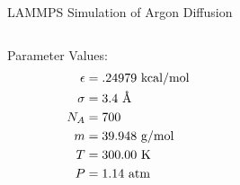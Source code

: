 \documentclass[professionalfont]{beamer}
\theoremstyle{remark}
\begin{document}
\begin{frame}{LAMMPS Simulation of Argon Diffusion}

	

	\begin{columns}

		\begin{column}{.33\paperwidth}
		
			Parameter Values:
			\begin{align*}
				\epsilon &= .24979~\text{kcal/mol}\\
				\sigma&=3.4~\text{\r{A}}\\
				N_A&=700\\
				m&=39.948~\text{g/mol}\\
				T&=300.00~\text{K}\\
				P&=1.14~\text{atm}
			\end{align*}
			\vspace{-10pt}

		\end{column}

		\begin{column}{.62\paperwidth}

			\vspace{-12pt}
			\begin{figure}
				\centering
				
				
			\end{figure}
		\end{column}

	\end{columns}
	
\end{frame}
\end{document}
